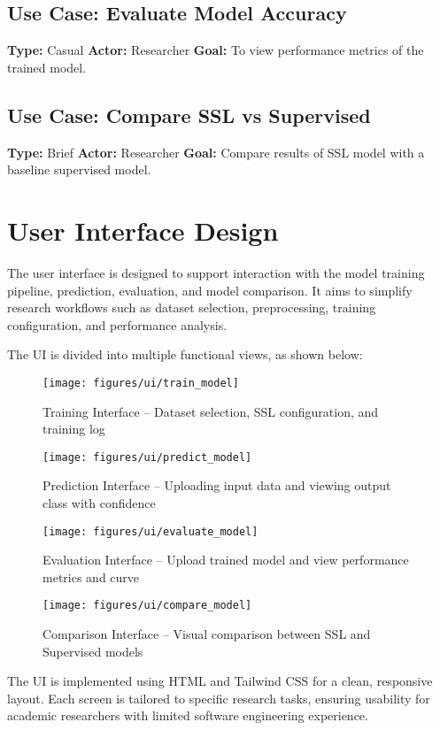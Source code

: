 \subsection*{Use Case: Evaluate Model Accuracy}
\textbf{Type:} Casual
\textbf{Actor:} Researcher
\textbf{Goal:} To view performance metrics of the trained model.

\subsection*{Use Case: Compare SSL vs Supervised}
\textbf{Type:} Brief
\textbf{Actor:} Researcher
\textbf{Goal:} Compare results of SSL model with a baseline supervised model.


\section{User Interface Design}
\label{sec:user-interface-design}

The user interface is designed to support interaction with the model training pipeline, prediction, evaluation, and model comparison.
It aims to simplify research workflows such as dataset selection, preprocessing, training configuration, and performance analysis.

The UI is divided into multiple functional views, as shown below:

\begin{figure}[H]
    \centering
    \texttt{[image: figures/ui/train\_model]}
    \caption{Training Interface – Dataset selection, SSL configuration, and training log}
    \label{fig:figure2}
\end{figure}

\begin{figure}[H]
    \centering
    \texttt{[image: figures/ui/predict\_model]}
    \caption{Prediction Interface – Uploading input data and viewing output class with confidence}
    \label{fig:figure3}
\end{figure}

\begin{figure}[H]
    \centering
    \texttt{[image: figures/ui/evaluate\_model]}
    \caption{Evaluation Interface – Upload trained model and view performance metrics and curve}
    \label{fig:figure4}
\end{figure}

\begin{figure}[H]
    \centering
    \texttt{[image: figures/ui/compare\_model]}
    \caption{Comparison Interface – Visual comparison between SSL and Supervised models}
    \label{fig:figure5}
\end{figure}

The UI is implemented using HTML and Tailwind CSS for a clean, responsive layout.
Each screen is tailored to specific research tasks, ensuring usability for academic researchers with limited software engineering experience.
